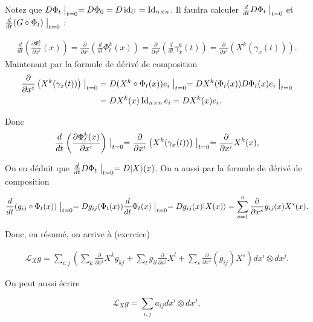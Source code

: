 \documentclass[french]{article}
\theoremstyle{definition}
\begin{document}
Notez que $D\Phi_t \bigm|_{t=0} =  D \Phi_0 = D \operatorname{id}_U =  \operatorname{Id}_{n \times n}$. Il faudra calculer   $\frac{d}{dt}  D\Phi_t \bigm|_{t=0}$ et  \(\frac{d}{dt}(G \circ \Phi_t) \bigm|_{t=0}\) :

\begin{gather*}
  \frac{d}{dt}\left(\frac{\partial \Phi_t^{k} }{\partial x ^{i}}(x) \right) = \frac{\partial  }{\partial x ^{i}}\left(\frac{d}{dt}\Phi ^{k}_t(x)\right) = \frac{\partial  }{\partial x ^{i}} \left(\frac{d}{dt} \gamma_x ^{k}(t)\right)   = \frac{\partial  }{\partial x ^{i}} \left(X ^{k}(\gamma_x(t))\right) .
\end{gather*} Maintenant par la formule de d\'eriv\'e de composition
\[
\begin{aligned}
\frac{\partial  }{\partial x ^{i}} \left(X ^{k}(\gamma_x(t))\right) \bigm|_{t=0}
& =  D(X^k \circ \Phi_t(x)) e_i\bigm|_{t=0} = DX^k (\Phi_t(x)) D\Phi_t(x) e_i \bigm|_{t=0}
\\ & =DX^k (x)   \operatorname{Id}_{n\times n}e_i = DX^k(x) e_i.
\end{aligned}
\]

 Donc \begin{equation}\label{eq234}
  \frac{d}{dt}\left(\frac{\partial \Phi ^{k}_t(x) }{\partial  x^i} \right)\bigm|_{t=0} = \frac{\partial  }{\partial x ^{i}}\left(X ^{k}(\gamma_x(t))\right)\bigm|_{t=0} = \frac{\partial  }{\partial x ^{i}}X ^{k}(x),
\end{equation}


On en d\'eduit que $\frac{d}{dt}  D\Phi_t \bigm|_{t=0} = D|X\rangle (x)$. On a aussi par la formule de d\'eriv\'e de composition

\[
\displaystyle \frac{d}{dt} (g_{ij} \circ \Phi_t(x))\bigm|_{t=0} = Dg_{ij}(\Phi_t(x))\frac{d}{dt} \Phi_t(x)\bigm|_{t=0} = Dg_{ij}(x)  |X(x) \rangle = \sum_{s=1}^n  \frac{\partial}{\partial x^s}g_{ij}(x) X^s(x).
\]

Donc, en résumé, on arrive \`a (exercice)

\begin{gather}
\mathcal{L}_{X}g = \sum_{i,j}\left(\sum_{k} \frac{\partial  }{\partial x ^{i}} X ^{k} g _{kj} + \sum_{l} g _{il} \frac{\partial  }{\partial x ^{j}}X ^{l} + \sum_{s}  \frac{\partial  }{\partial x ^{s}}(g _{ij})X ^{s} \right)d x^{i}\otimes d x^{j}.
\end{gather}

On peut aussi écrire

\[\mathcal{L}_X g = \sum_{i,j} a _{ij}d x^{i}\otimes d x^{j},\]
\end{document}
